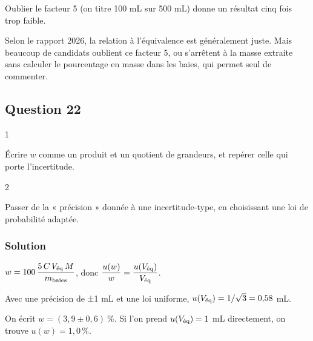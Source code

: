 \documentclass[11pt,a4paper]{article}
\newcommand{\equationajustee}[1]{%
  \sbox{\boiteequation}{$\displaystyle #1$}%
  \ifdim\wd\boiteequation>\linewidth
    \[\resizebox{\linewidth}{!}{\usebox{\boiteequation}}\]%
  \else
    \[#1\]%
  \fi}
\begin{document}
\begin{piege}

Oublier le facteur 5 (on titre 100 mL sur 500 mL) donne un résultat cinq fois trop faible.

\end{piege}

\begin{jury}

Selon le rapport 2026, la relation à l'équivalence est généralement juste. Mais beaucoup de candidats oublient ce facteur 5, ou s'arrêtent à la masse extraite sans calculer le pourcentage en masse dans les baies, qui permet seul de commenter.

\end{jury}

\hypertarget{question-22}{%
\subsection{Question 22}\label{question-22}}

\begin{indication}{1}

Écrire \(w\) comme un produit et un quotient de grandeurs, et repérer celle qui porte l'incertitude.

\end{indication}

\begin{indication}{2}

Passer de la « précision » donnée à une incertitude-type, en choisissant une loi de probabilité adaptée.

\end{indication}

\hypertarget{solution-21}{%
\subsubsection{Solution}\label{solution-21}}

\(w = 100\,\dfrac{5\,C\,V_{\rm \text{éq}}\,M}{m_{\rm baies}}\), donc \(\dfrac{u(w)}{w} = \dfrac{u(V_{\rm \text{éq}})}{V_{\rm \text{éq}}}\).

Avec une précision de ±1 mL et une loi uniforme, \(u(V_{\rm \text{éq}}) = 1/\sqrt3 = 0{,}58\) mL.

\equationajustee{u(w) = 3{,}88\ \%\times\frac{0{,}58}{4{,}0}}

\equationajustee{\boxed{u(w) = 0{,}6\ \%}}

On écrit \(w = (3{,}9 \pm 0{,}6)\ \%\). Si l'on prend \(u(V_{\rm \text{éq}}) = 1\) mL directement, on trouve \(u(w) = 1{,}0\,\%\).
\end{document}
